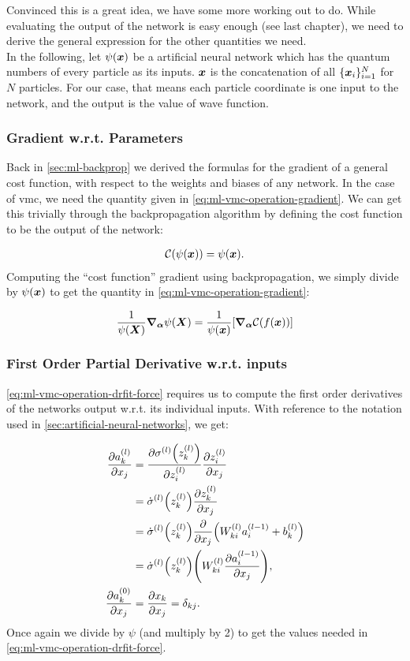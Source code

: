 \documentclass[Thesis.tex]{subfiles}
\begin{document}
Convinced this is a great idea, we have some more working out to do. While
evaluating the output of the network is easy enough (see last chapter), we need
to derive the general expression for the other quantities we need.\\

In the following, let $\psi(\bm{x})$ be a artificial neural network which has the
quantum numbers of every particle as its inputs. $\bm{x}$ is the concatenation of
all $\{\bm{x}_i\}_{i=1}^N$ for $N$ particles. For our case, that means each
particle coordinate is one input to the network, and the output is the value of
wave function.

\subsubsection{Gradient w.r.t. Parameters}

Back in \cref{sec:ml-backprop} we derived the formulas for the gradient of a
general cost function, with respect to the weights and biases of any network. In
the case of \gls{vmc}, we need the quantity given in
\cref{eq:ml-vmc-operation-gradient}. We can get this trivially through the
backpropagation algorithm by defining the cost function to be the output of the
network:

\begin{align}
  \mathcal{C}(\psi(\bm{x})) = \psi(\bm{x}).
\end{align}
Computing the ``cost function'' gradient using backpropagation, we simply divide
by $\psi(\bm{x})$ to get the quantity in \cref{eq:ml-vmc-operation-gradient}:

\begin{align}
    \frac{1}{\psi(\bm{X})}\grad_{\bm{\alpha}}{\psi(\bm{X})} = \frac{1}{\psi(\bm{x})}\qty[\grad_{\bm{\alpha}}{\mathcal{C}(f(\bm{x}))}]
\end{align}

\subsubsection{First Order Partial Derivative w.r.t. inputs}

\cref{eq:ml-vmc-operation-drfit-force} requires us to compute the first order
derivatives of the networks output w.r.t. its individual inputs. With reference
to the notation used in \cref{sec:artificial-neural-networks}, we get:

\begin{align}
  \pdv{a_k^{(l)}}{x_j} &= \pdv{\sigma^{(l)}\qty(z_k^{(l)})}{z_i^{(l)}}\pdv{z_i^{(l)}}{x_j}\\
  &= \dot\sigma^{(l)}\qty(z_k^{(l)})\pdv{z_k^{(l)}}{x_j}\\
  &= \dot\sigma^{(l)}\qty(z_k^{(l)})\pdv{}{x_j}\qty(W_{ki}^{(l)}a_i^{(l-1)} + b^{(l)}_k)\\
  &= \dot\sigma^{(l)}\qty(z_k^{(l)})\qty(W^{(l)}_{ki}\pdv{a_i^{(l-1)}}{x_j})\label{eq:first-order-partial-nn},\\
  \pdv{a_k^{(0)}}{x_j} &= \pdv{x_k}{x_j} = \delta_{kj}.
\end{align}
Once again we divide by $\psi$ (and multiply by 2) to get the values needed in
\cref{eq:ml-vmc-operation-drfit-force}.
\end{document}
